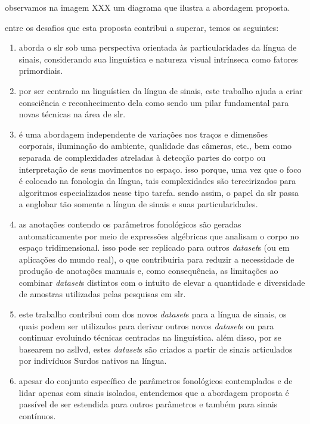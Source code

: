 observamos na imagem XXX um diagrama que ilustra a abordagem proposta.


entre os desafios que esta proposta contribui a superar, temos os seguintes:

\begin{enumerate}
    \item aborda o \acrshort{slr} sob uma perspectiva orientada às particularidades da língua de sinais, considerando sua linguística e natureza visual intrínseca como fatores primordiais.
    
    \item por ser centrado na linguística da língua de sinais, este trabalho ajuda a criar consciência e reconhecimento dela como sendo um pilar fundamental para novas técnicas na área de \acrshort{slr}.

    \item é uma abordagem independente de variações nos traços e dimensões corporais, iluminação do ambiente, qualidade das câmeras, etc., bem como separada de complexidades atreladas à detecção partes do corpo ou interpretação de seus movimentos no espaço. isso porque, uma vez que o foco é colocado na fonologia da língua, tais complexidades são terceirizados para algoritmos especializados nesse tipo tarefa. sendo assim, o papel da \acrshort{slr} passa a englobar tão somente a língua de sinais e suas particularidades.
    
    \item as anotações contendo os parâmetros fonológicos são geradas automaticamente por meio de expressões algébricas que analisam o corpo no espaço tridimensional. isso pode ser replicado para outros \textit{dataset}s (ou em aplicações do mundo real), o que contribuiria para reduzir a necessidade de produção de anotações manuais e, como consequência, as limitações ao combinar \textit{dataset}s distintos com o intuito de elevar a quantidade e diversidade de amostras utilizadas pelas pesquisas em \acrshort{slr}.
    
    \item este trabalho contribui com dos novos \textit{dataset}s para a língua de sinais, os quais podem ser utilizados para derivar outros novos \textit{dataset}s ou para continuar evoluindo técnicas centradas na linguística. além disso, por se basearem no \acrshort{asllvd}, estes \textit{dataset}s são criados a partir de sinais articulados por indivíduos Surdos nativos na língua.

    \item apesar do conjunto específico de parâmetros fonológicos contemplados e de lidar apenas com sinais isolados, entendemos que a abordagem proposta é passível de ser estendida para outros parâmetros e também para sinais contínuos.

\end{enumerate}










